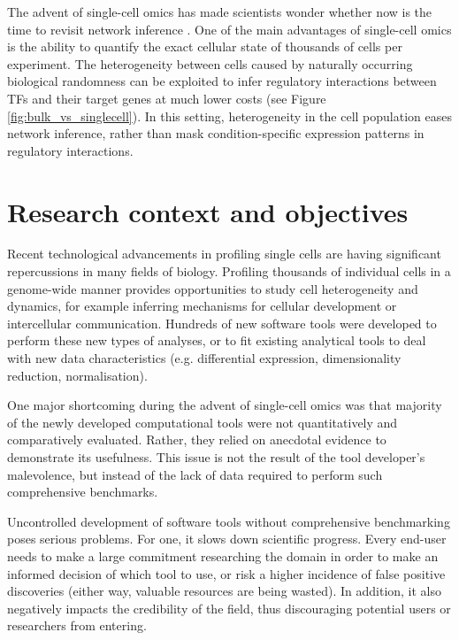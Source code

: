 The advent of single-cell omics has made scientists wonder whether now is the time to revisit network inference \cite{stegle_computationalanalyticalchallenges_2015}. 
One of the main advantages of single-cell omics is the ability to quantify the exact cellular state of thousands of cells per experiment. The heterogeneity between cells caused by naturally occurring biological randomness \cite{padovan-merhar_usingvariabilitygene_2013} can be exploited to infer regulatory interactions between TFs and their target genes at much lower costs (see Figure \ref{fig:bulk_vs_singlecell}).
In this setting, heterogeneity in the cell population eases network inference, rather than mask condition-specific expression patterns in regulatory interactions.

\section{Research context and objectives}
Recent technological advancements in profiling single cells are having significant repercussions in many fields of biology. Profiling thousands of individual cells in a genome-wide manner provides opportunities to study cell heterogeneity and dynamics, for example inferring mechanisms for cellular development or intercellular communication. 
Hundreds of new software tools were developed \cite{zappia_exploringsinglecellrnaseq_2018} to perform these new types of analyses, or to fit existing analytical tools to deal with new data characteristics (e.g. differential expression, dimensionality reduction, normalisation). 

One major shortcoming during the advent of single-cell omics was that majority of the newly developed computational tools were not quantitatively and comparatively evaluated. Rather, they relied on anecdotal evidence to demonstrate its usefulness. This issue is not the result of the tool developer's malevolence, but instead of the lack of data required to perform such comprehensive benchmarks.

Uncontrolled development of software tools without comprehensive benchmarking poses serious problems. 
For one, it slows down scientific progress. Every end-user needs to make a large commitment researching the domain in order to make an informed decision of which tool to use, or risk a higher incidence of false positive discoveries (either way, valuable resources are being wasted). In addition, it also negatively impacts the credibility of the field, thus discouraging potential users or researchers from entering.

